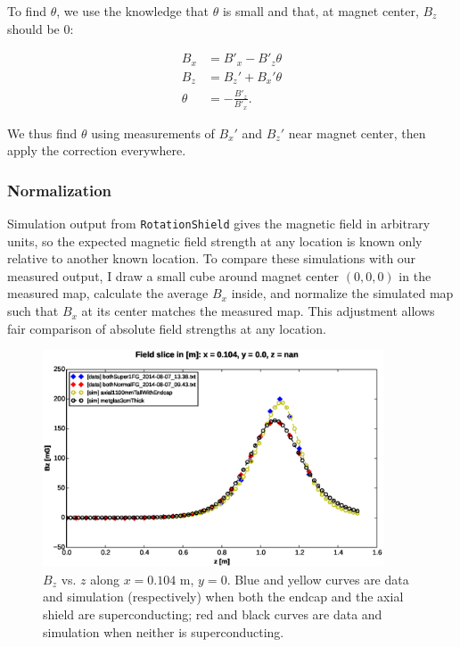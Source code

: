 \documentclass[twocolumn,aps,prb,citeautoscript]{revtex4-1}
\begin{document}
To find $\theta$, we use the knowledge that $\theta$ is small and that, at magnet center,
$B_z$ should be 0:

\begin{align*}
B_x &= B'_x - B'_z \theta \\ B_z &= B_z' + B_x' \theta \\
\theta &= -\frac{B'_z}{B'_x}.
\end{align*}

We thus find $\theta$ using measurements of $B_x'$ and $B_z'$ near magnet center, then apply the
correction everywhere.

\subsubsection{Normalization}

Simulation output from \texttt{RotationShield} gives the magnetic field in arbitrary units, so the expected
magnetic field strength at any location is known only relative to another known location. To compare these simulations
with our measured output, I draw a small cube around magnet center $(0, 0, 0)$ in the measured map,
calculate the average $B_x$ inside, and normalize the simulated map such that $B_x$ at its center matches the
measured map. This adjustment allows fair comparison of absolute field strengths at any location.

\begin{figure}
\includegraphics[width=0.9\textwidth]{../savedplots/pr2_agree.eps}
\caption{\label{fig:agree}$B_z$ vs. $z$ along $x = 0.104$ m, $y = 0$. Blue and yellow curves are data and simulation
(respectively) when both the endcap and the axial shield are superconducting; red and black curves are data and
simulation when neither is superconducting.}
\end{figure}
\end{document}
